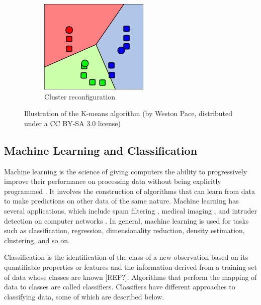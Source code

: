 \documentclass[conference,compsoc]{IEEEtran}
\begin{document}
\begin{figure}[htbp]
        \begin{subfigure}{0.23\textwidth}
                \includegraphics[width=\textwidth]{kmean04.png}
                \caption{Cluster reconfiguration}
                \label{fig:kmean04}
        \end{subfigure}
        \caption{Illustration of the K-means algorithm (by Weston Pace, distributed under a CC BY-SA 3.0 license)}
        \label{fig:kmean}
\end{figure}
\subsection{Machine Learning and Classification}

Machine learning is the science of giving computers the ability to progressively improve their performance on processing data without being explicitly programmed \cite{samuel59}. It involves the construction of algorithms that can learn from data to make predictions on other data of the same nature. Machine learning has several applications, which include spam filtering \cite{guzella09}, medical imaging \cite{wernick10}, and intruder detection on computer networks \cite{sommer10}. In general, machine learning is used for tasks such as classification, regression, dimensionality reduction, density estimation, clustering, and so on.

\indent Classification is the identification of the class of a new observation based on its quantifiable properties or features and the information derived from a training set of data whose classes are known [REF?]. Algorithms that perform the mapping of data to classes are called classifiers. Classifiers have different approaches to classifying data, some of which are described below.
\end{document}
